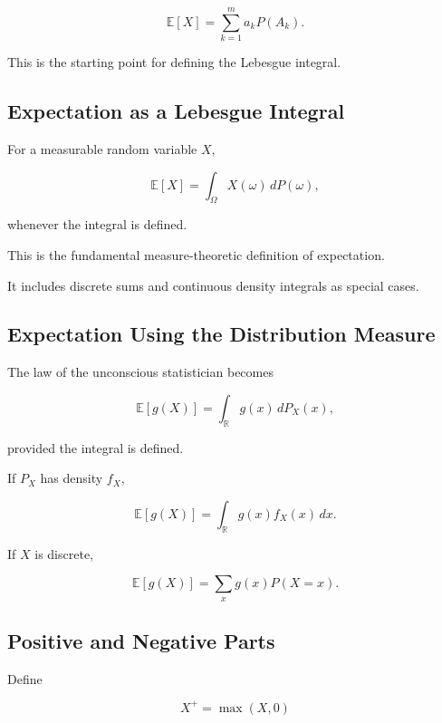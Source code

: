 \[
\boxed{
\mathbb{E}[X]
=
\sum_{k=1}^{m}
a_kP(A_k).
}
\]

This is the starting point for defining the Lebesgue integral.

\subsection{Expectation as a Lebesgue Integral}
\label{subsec:expectation-lebesgue-integral}

For a measurable random variable \(X\),

\[
\boxed{
\mathbb{E}[X]
=
\int_\Omega
X(\omega)\,dP(\omega),
}
\]

whenever the integral is defined.

This is the fundamental measure-theoretic definition of expectation.

It includes discrete sums and continuous density integrals as special
cases.

\subsection{Expectation Using the Distribution Measure}
\label{subsec:expectation-law-integral}

The law of the unconscious statistician becomes

\[
\boxed{
\mathbb{E}[g(X)]
=
\int_{\mathbb{R}}
g(x)\,dP_X(x),
}
\]

provided the integral is defined.

If \(P_X\) has density \(f_X\),

\[
\boxed{
\mathbb{E}[g(X)]
=
\int_{\mathbb{R}}
g(x)f_X(x)\,dx.
}
\]

If \(X\) is discrete,

\[
\boxed{
\mathbb{E}[g(X)]
=
\sum_x
g(x)P(X=x).
}
\]

\subsection{Positive and Negative Parts}
\label{subsec:positive-negative-parts}

Define

\[
\boxed{
X^+
=
\max(X,0)
}
\]

